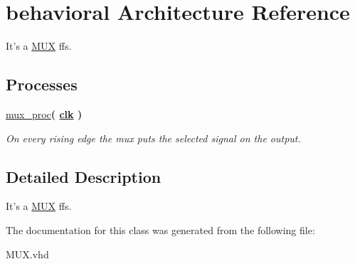 \hypertarget{class_m_u_x_1_1behavioral}{\section{behavioral \-Architecture \-Reference}
\label{class_m_u_x_1_1behavioral}
}


\-It's a \hyperlink{class_m_u_x}{\-M\-U\-X} ffs.  


\*
\*
\subsection*{\-Processes}
 \begin{DoxyCompactItemize}
\item 
\hypertarget{class_m_u_x_1_1behavioral_a2e0ca9ab436788ec02fcd0ed62456ade}{\hyperlink{class_m_u_x_1_1behavioral_a2e0ca9ab436788ec02fcd0ed62456ade}{mux\-\_\-proc}{\bfseries  ( {\bfseries {\bfseries \hyperlink{class_m_u_x_a70f7f9ef1e412f6da35c2b9e17540895}{clk}}   } )}}\label{class_m_u_x_1_1behavioral_a2e0ca9ab436788ec02fcd0ed62456ade}

\begin{DoxyCompactList}\small\item\em \-On every rising edge the mux puts the selected signal on the output. \end{DoxyCompactList}\end{DoxyCompactItemize}


\subsection{\-Detailed \-Description}
\-It's a \hyperlink{class_m_u_x}{\-M\-U\-X} ffs. 

\-The documentation for this class was generated from the following file\-:\begin{DoxyCompactItemize}
\item 
\-M\-U\-X.\-vhd\end{DoxyCompactItemize}
